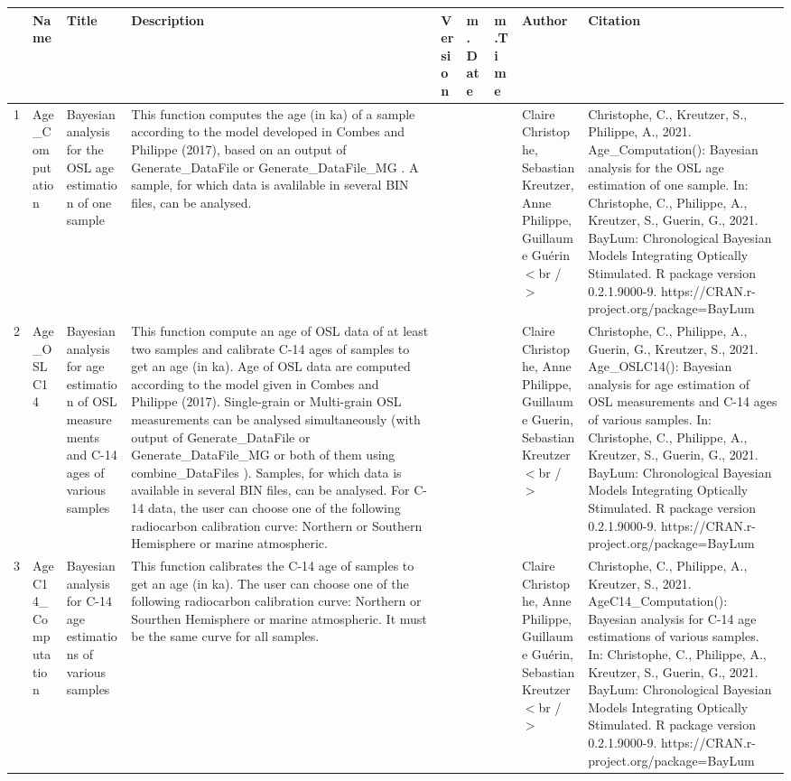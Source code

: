 \begin{table}[ht]
\centering
\begin{tabular}{rllllllll}
  \hline
 & Name & Title & Description & Version & m.Date & m.Time & Author & Citation \\ 
  \hline
1 & Age\_Computation & Bayesian analysis for the OSL age estimation of one sample & This function computes the age (in ka) of a sample according to the model developed in Combes and Philippe (2017), based on an output of  Generate\_DataFile  or  Generate\_DataFile\_MG .  A sample, for which data is avalilable in several BIN files, can be analysed. &  &  &  & Claire Christophe, Sebastian Kreutzer, Anne Philippe, Guillaume Guérin$<$br /$>$ & Christophe, C., Kreutzer, S., Philippe, A., 2021. Age\_Computation(): Bayesian analysis for the OSL age estimation of one sample. In: Christophe, C., Philippe, A., Kreutzer, S., Guerin, G., 2021. BayLum: Chronological Bayesian Models Integrating Optically Stimulated. R package version 0.2.1.9000-9. https://CRAN.r-project.org/package=BayLum
 \\ 
  2 & Age\_OSLC14 & Bayesian analysis for age estimation of OSL measurements and C-14 ages of various samples & This function compute an age of OSL data of at least two samples and calibrate C-14 ages of samples to get an age (in ka).  Age of OSL data are computed according to the model given in Combes and Philippe (2017). Single-grain or Multi-grain OSL measurements can be analysed simultaneously (with output of  Generate\_DataFile  or  Generate\_DataFile\_MG  or both of them using  combine\_DataFiles ). Samples, for which data is available in several BIN files, can be analysed.  For C-14 data, the user can choose one of the following radiocarbon calibration curve: Northern or Southern Hemisphere or marine atmospheric. &  &  &  & Claire Christophe, Anne Philippe, Guillaume Guerin, Sebastian Kreutzer$<$br /$>$ & Christophe, C., Philippe, A., Guerin, G., Kreutzer, S., 2021. Age\_OSLC14(): Bayesian analysis for age estimation of OSL measurements and C-14 ages of various samples. In: Christophe, C., Philippe, A., Kreutzer, S., Guerin, G., 2021. BayLum: Chronological Bayesian Models Integrating Optically Stimulated. R package version 0.2.1.9000-9. https://CRAN.r-project.org/package=BayLum
 \\ 
  3 & AgeC14\_Computation & Bayesian analysis for C-14 age estimations of various samples & This function calibrates the C-14 age of samples to get an age (in ka). The user can choose one of the following radiocarbon calibration curve: Northern or Sourthen Hemisphere or marine atmospheric. It must be the same curve for all samples. &  &  &  & Claire Christophe, Anne Philippe, Guillaume Guérin, Sebastian Kreutzer$<$br /$>$ & Christophe, C., Philippe, A., Kreutzer, S., 2021. AgeC14\_Computation(): Bayesian analysis for C-14 age estimations of various samples. In: Christophe, C., Philippe, A., Kreutzer, S., Guerin, G., 2021. BayLum: Chronological Bayesian Models Integrating Optically Stimulated. R package version 0.2.1.9000-9. https://CRAN.r-project.org/package=BayLum

\end{tabular}
\end{table}
